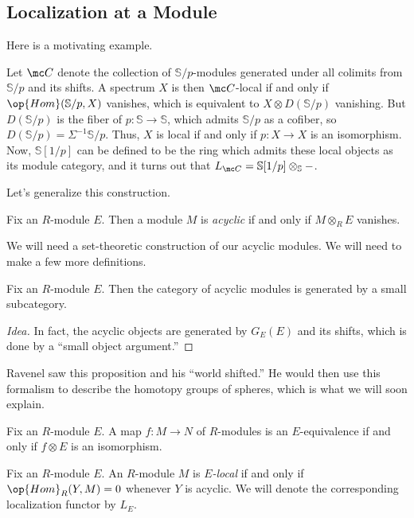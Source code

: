 \documentclass[../notes.tex]{subfiles}
\begin{document}
\subsection{Localization at a Module}
Here is a motivating example.
\begin{example}
	Let $\mc C$ denote the collection of $\mathbb S/p$-modules generated under all colimits from $\mathbb S/p$ and its shifts. A spectrum $X$ is then $\mc C$-local if and only if $\op{Hom}(\mathbb S/p,X)$ vanishes, which is equivalent to $X\otimes D(\mathbb S/p)$ vanishing. But $D(\mathbb S/p)$ is the fiber of $p\colon\mathbb S\to\mathbb S$, which admits $\mathbb S/p$ as a cofiber, so $D(\mathbb S/p)=\Sigma^{-1}\mathbb S/p$. Thus, $X$ is local if and only if $p\colon X\to X$ is an isomorphism. Now, $\mathbb S[1/p]$ can be defined to be the ring which admits these local objects as its module category, and it turns out that $L_{\mc C}=\mathbb S[1/p]\otimes_{\mathbb S}-$.
\end{example}
Let's generalize this construction.
\begin{definition}[acyclic]
	Fix an $R$-module $E$. Then a module $M$ is \textit{acyclic} if and only if $M\otimes_RE$ vanishes.
\end{definition}
We will need a set-theoretic construction of our acyclic modules. We will need to make a few more definitions.
\begin{proposition}
	Fix an $R$-module $E$. Then the category of acyclic modules is generated by a small subcategory.
\end{proposition}
\begin{proof}[Idea]
	In fact, the acyclic objects are generated by $G_E(E)$ and its shifts, which is done by a ``small object argument.''
\end{proof}
\begin{remark}
	Ravenel saw this proposition and his ``world shifted.'' He would then use this formalism to describe the homotopy groups of spheres, which is what we will soon explain.
\end{remark}
\begin{definition}[equivalence]
	Fix an $R$-module $E$. A map $f\colon M\to N$ of $R$-modules is an $E$-equiv\-alence if and only if $f\otimes E$ is an isomorphism.
\end{definition}
\begin{definition}[local]
	Fix an $R$-module $E$. An $R$-module $M$ is \textit{$E$-local} if and only if $\op{Hom}_R(Y,M)=0$ whenever $Y$ is acyclic. We will denote the corresponding localization functor by $L_E$.
\end{definition}
\end{document}
